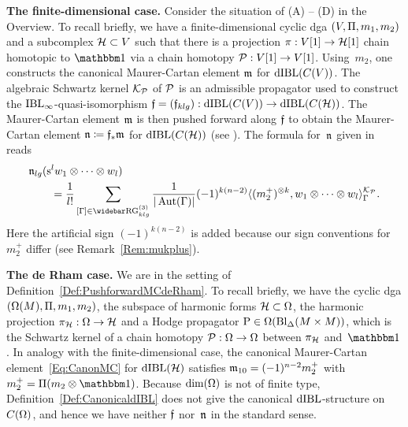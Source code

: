 \documentclass[\MainFolder/Text.tex]{subfiles}
\begin{document}
\textbf{The finite-dimensional case.} Consider the situation of (A) -- (D) in the Overview. To recall briefly, we have a finite-dimensional cyclic dga $(V,\Pi,m_1, m_2)$ and a subcomplex $\mathcal{H} \subset V$ such that there is a projection $\pi: V[1] \rightarrow \mathcal{H}[1]$ chain homotopic to $\Id$ via a chain homotopy $\mathcal{P}: V[1] \rightarrow V[1]$. Using~$m_2$, one constructs the canonical Maurer-Cartan element $\mathfrak{m}$ for $\mathrm{dIBL}(C(V))$. The algebraic Schwartz kernel $\mathcal{K}_{\mathcal{P}}$ of $\mathcal{P}$ is an admissible propagator used to construct the $\mathrm{IBL}_\infty$-quasi-isomorphism $\mathfrak{f} = (\mathfrak{f}_{klg}): \mathrm{dIBL}(C(V)) \rightarrow \mathrm{dIBL}(C(\mathcal{H}))$. The Maurer-Cartan element $\mathfrak{m}$ is then pushed forward along $\mathfrak{f}$ to obtain the Maurer-Cartan element $\mathfrak{n} \coloneqq \mathfrak{f}_* \mathfrak{m}$  for $\mathrm{dIBL}(C(\mathcal{H}))$ (see \cite[Lemma 9.5]{Cieliebak2015}). The formula for~$\mathfrak{n}$ given in~\cite[Remark~12.10]{Cieliebak2015} reads
\begin{equation} \label{Eq:PushforwardMC}
\begin{aligned} &\PMC_{lg}(\Susp^l w_1 \otimes \dotsb \otimes  w_l) \\
&\qquad=\frac{1}{l!}\sum_{[\Gamma]\in \TRRG_{klg}} \frac{1}{\Abs{\Aut(\Gamma)}} (-1)^{k(n-2)}\langle (m_2^+)^{\otimes k}, w_1 \otimes \dotsb \otimes w_l \rangle_{\Gamma}^{\Kern_{\Htp}}.
\end{aligned}\end{equation}
Here the artificial sign $(-1)^{k(n-2)}$ is added because our sign conventions for $m_2^+$ differ (see Remark~\ref{Rem:mukplus}).


\textbf{The de Rham case.}
We are in the setting of Definition~\ref{Def:PushforwardMCdeRham}. To recall briefly, we have the cyclic dga $(\Omega(M), \Pi, m_1, m_2)$, the subspace of harmonic forms $\mathcal{H}\subset \Omega$, the harmonic projection $\pi_{\mathcal{H}}: \Omega\rightarrow \mathcal{H}$ and a Hodge propagator $\mathrm{P}\in \Omega(\mathrm{Bl}_\Delta(M\times M))$, which is the Schwartz kernel of a chain homotopy $\mathcal{P}: \Omega \rightarrow \Omega$ between $\pi_{\mathcal{H}}$ and~$\Id$. In analogy with the finite-dimensional case, the canonical Maurer-Cartan element~\eqref{Eq:CanonMC} for $\mathrm{dIBL}(\mathcal{H})$ satisfies $\mathfrak{m}_{10} = (-1)^{n-2}m_2^+$ with $m_2^+ = \Pair(m_2 \otimes \Id)$. Because $\dim(\Omega)$ is not of finite type, Definition~\ref{Def:CanonicaldIBL} does not give the canonical $\mathrm{dIBL}$-structure on $C(\Omega)$, and hence we have neither $\mathfrak{f}$ nor~$\mathfrak{n}$ in the standard sense.
\end{document}
